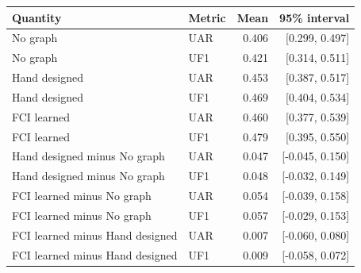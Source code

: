 \begin{tabular}{llrr}
\toprule
Quantity & Metric & Mean & 95\% interval \\
\midrule
No graph & UAR & 0.406 & [0.299, 0.497] \\
No graph & UF1 & 0.421 & [0.314, 0.511] \\
Hand designed & UAR & 0.453 & [0.387, 0.517] \\
Hand designed & UF1 & 0.469 & [0.404, 0.534] \\
FCI learned & UAR & 0.460 & [0.377, 0.539] \\
FCI learned & UF1 & 0.479 & [0.395, 0.550] \\
Hand designed minus No graph & UAR & 0.047 & [-0.045, 0.150] \\
Hand designed minus No graph & UF1 & 0.048 & [-0.032, 0.149] \\
FCI learned minus No graph & UAR & 0.054 & [-0.039, 0.158] \\
FCI learned minus No graph & UF1 & 0.057 & [-0.029, 0.153] \\
FCI learned minus Hand designed & UAR & 0.007 & [-0.060, 0.080] \\
FCI learned minus Hand designed & UF1 & 0.009 & [-0.058, 0.072] \\
\bottomrule
\end{tabular}
